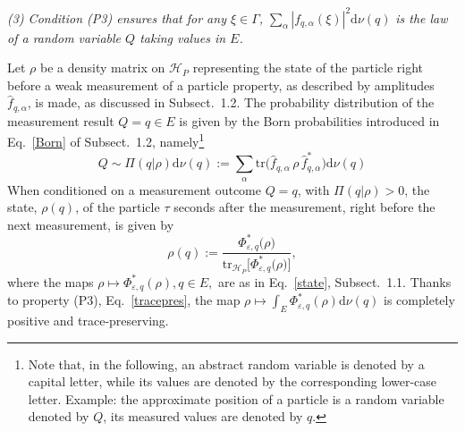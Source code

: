 \documentclass[12pt]{article}
\begin{document}
\textit{(3) Condition (P3) ensures that for any $\xi\in \Gamma$, }$\sum_{\alpha}|f_{q,\alpha}(\xi)|^2\text{d}\nu(q)$
\textit{ is the law of a random variable $Q$ taking values in $E$.}

Let $\rho$ be a density matrix on $\mathcal{H}_P$ representing the state of the particle right before a weak 
measurement of a particle property, as described by amplitudes $\widehat{f}_{q,\alpha}$, is made, as discussed 
in Subsect.~1.2. The probability distribution of the measurement result $Q=q\in E$ is given 
by the Born probabilities introduced in Eq.~\eqref{Born} of Subsect.~1.2, namely\footnote{Note that, in the following, an abstract random variable is denoted by a capital letter, while its values are denoted by the corresponding lower-case letter. Example: the approximate position of a particle is a random variable denoted by $Q$, its measured values are denoted by $q$.}
$$ Q \sim \Pi(q \vert \rho)\text{d}\nu(q):=\sum_{\alpha}\text{tr}\big(\widehat{f}_{q, \alpha}\,\rho\, \widehat{f}_{q, \alpha}^{*}\big)\text{d}\nu(q)$$
When conditioned on a measurement outcome $Q=q$, with $\Pi(q\vert \rho) >0$, the state, $\rho(q)$, of the particle 
$\tau$ seconds after the measurement, right before the next measurement, is given by
\begin{equation}\label{q-state}
\rho(q):= \frac{\Phi_{\varepsilon, q}^{*}\big(\rho\big)}{\text{tr}_{\mathcal{H}_P}\big[\Phi_{\varepsilon, q}^{*}(\rho\big)\big] },
\end{equation}
where the maps $\rho \mapsto \Phi_{\varepsilon, q}^{*}(\rho), q\in E,$ are as in Eq.~\eqref{state}, Subsect.~1.1.
Thanks to property (P3), Eq.~\eqref{tracepres}, the map $\rho \mapsto \int_{E} \Phi_{\varepsilon, q}^{*}(\rho) \text{d}\nu(q)$ 
is completely positive and trace-preserving.
\end{document}
